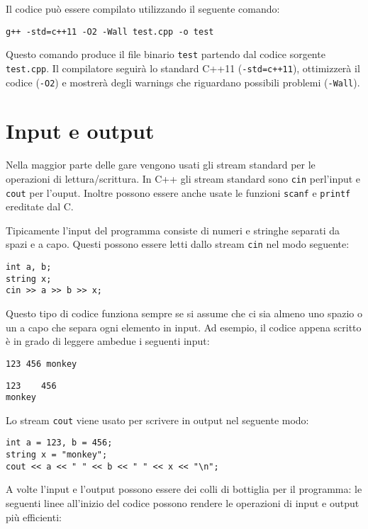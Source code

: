Il codice può essere compilato utilizzando il seguente comando:

\begin{lstlisting}
g++ -std=c++11 -O2 -Wall test.cpp -o test
\end{lstlisting}

Questo comando produce il file binario \texttt{test}
partendo dal codice sorgente \texttt{test.cpp}.
Il compilatore seguirà lo standard C++11 (\texttt{-std=c++11}),
ottimizzerà il codice (\texttt{-O2})
e mostrerà degli warnings che riguardano possibili problemi (\texttt{-Wall}).

\section{Input e output}


Nella maggior parte delle gare vengono usati gli stream standard
per le operazioni di lettura/scrittura.
In C++ gli stream standard sono 
\texttt{cin} perl'input e \texttt{cout} per l'ouput.
Inoltre possono essere anche usate le funzioni
\texttt{scanf} e \texttt{printf} ereditate dal C.

Tipicamente l'input del programma consiste di numeri 
e stringhe separati da spazi e a capo.
Questi possono essere letti dallo stream \texttt{cin}
nel modo seguente:

\begin{lstlisting}
int a, b;
string x;
cin >> a >> b >> x;
\end{lstlisting}

Questo tipo di codice funziona sempre
se si assume che ci sia almeno uno spazio o un a capo
che separa ogni elemento in input.
Ad esempio, il codice appena scritto è in grado 
di leggere ambedue i seguenti input:

\begin{lstlisting}
123 456 monkey
\end{lstlisting}
\begin{lstlisting}
123    456
monkey
\end{lstlisting}

Lo stream \texttt{cout} viene usato per scrivere
in output nel seguente modo: 

\begin{lstlisting}
int a = 123, b = 456;
string x = "monkey";
cout << a << " " << b << " " << x << "\n";
\end{lstlisting}

A volte l'input e l'output possono essere dei 
colli di bottiglia per il programma: le seguenti 
linee all'inizio del codice possono rendere 
le operazioni di input e output più efficienti:

